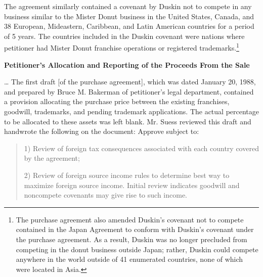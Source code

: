\begin{select}



The agreement similarly contained a covenant by Duskin not to compete in any business similar to the Mister Donut
business in the United States, Canada, and 38 European, Mideastern, Caribbean, and Latin American countries
for a period of 5 years. The countries included in the Duskin covenant were nations where petitioner had Mister Donut
franchise operations or registered trademarks.\footnote[11]{The purchase agreement also amended Duskin's covenant not to compete contained in the Japan Agreement to conform with Duskin's covenant under the purchase agreement. As a result, Duskin was no longer precluded from competing in the donut business outside Japan; rather, Duskin could compete anywhere in the world outside of 41 enumerated countries, none of which were located in Asia.}
\begin{center} \textbf{Petitioner's Allocation and Reporting of the Proceeds From the Sale}
\end{center}
\ldots
The first draft [of the purchase agreement], which was dated January 20, 1988, and prepared by Bruce M. Bakerman of petitioner's legal
department, contained a provision allocating the purchase price between the existing franchises, goodwill, trademarks,
and pending trademark applications. The actual percentage to be allocated to these assets was left blank. Mr. Suess
reviewed this draft and handwrote the following on the document:
Approve subject to:
\begin{quote}
1) Review of foreign tax consequences associated with each country covered by the agreement;

2) Review of foreign source income rules to determine best way to maximize foreign source income.
Initial review indicates goodwill and noncompete covenants may give rise to such income.


\end{quote}
\end{select}
